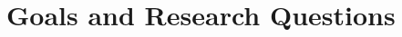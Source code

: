 \section{Goals and Research Questions}\label{sec:goals-and-research-questions}
\label{sec:GoalsandResearchQuestions}

